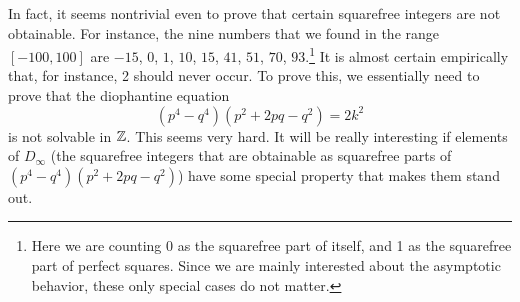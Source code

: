 In fact, it seems nontrivial even to prove that certain squarefree
integers are not obtainable. For instance, the nine numbers that we
found in the range $[-100, 100]$ are $-15$, $0$, $1$, $10$, $15$,
$41$, $51$, $70$, $93$.\footnote{%
  Here we are counting 0 as the squarefree part of itself, and 1 as
  the squarefree part of perfect squares. Since we are mainly
  interested about the asymptotic behavior, these only special cases
  do not matter.}
It is almost certain empirically that, for instance, 2 should never
occur. To prove this, we essentially need to prove that the
diophantine equation
\[
(p^4 - q^4)(p^2 + 2pq - q^2) = 2 k^2
\]
is not solvable in $\mathbb{Z}$. This seems very hard. It will be really
interesting if elements of $D_\infty$ (the squarefree integers that
are obtainable as squarefree parts of $(p^4 - q^4)(p^2 + 2pq - q^2)$)
have some special property that makes them stand out.

